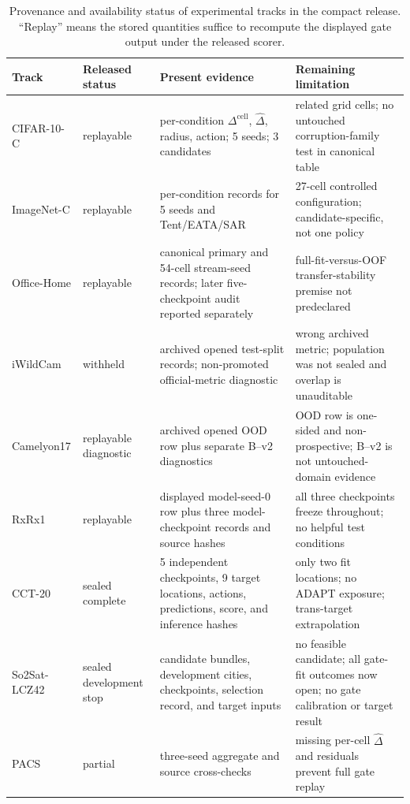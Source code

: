 \begin{table}[!t]
\centering
\scriptsize
\caption{Provenance and availability status of experimental tracks in the compact release. ``Replay'' means the
stored quantities suffice to recompute the displayed gate output under the released scorer.}
\label{tab:compact-provenance}
\begin{tabular}{@{}p{}p{}p{}p{}@{}}
\toprule
Track & Released status & Present evidence & Remaining limitation \\
\midrule
CIFAR-10-C & replayable & per-condition $\Delta^{\mathrm{cell}}$, $\widehat\Delta$, radius, action; 5 seeds; 3 candidates & related grid cells; no untouched corruption-family test in canonical table \\
ImageNet-C & replayable & per-condition records for 5 seeds and Tent/EATA/SAR & 27-cell controlled configuration; candidate-specific, not one policy \\
Office-Home & replayable & canonical primary and 54-cell stream-seed records; later five-checkpoint audit reported separately & full-fit-versus-OOF transfer-stability premise not predeclared \\
iWildCam & withheld & archived opened test-split records; non-promoted official-metric diagnostic & wrong archived metric; population was not sealed and overlap is unauditable \\
Camelyon17 & replayable diagnostic & archived opened OOD row plus separate B--v2 diagnostics & OOD row is one-sided and non-prospective; B--v2 is not untouched-domain evidence \\
RxRx1 & replayable & displayed model-seed-0 row plus three model-checkpoint records and source hashes & all three checkpoints freeze throughout; no helpful test conditions \\
CCT-20 & sealed complete & 5 independent checkpoints, 9 target locations, actions, predictions, score, and inference hashes & only two fit locations; no ADAPT exposure; trans-target extrapolation \\
So2Sat-LCZ42 & sealed development stop & \SoTwoCandidateCount{} candidate bundles, \SoTwoDevelopmentCityCount{} development cities, \SoTwoCheckpointCount{} checkpoints, selection record, and \SoTwoTargetInputCount{} target inputs & no feasible candidate; all \SoTwoOpenedOutcomeCount{} gate-fit outcomes now open; no gate calibration or target result \\
PACS & partial & three-seed aggregate and source cross-checks & missing per-cell $\widehat\Delta$ and residuals prevent full gate replay \\

\end{tabular}
\end{table}
